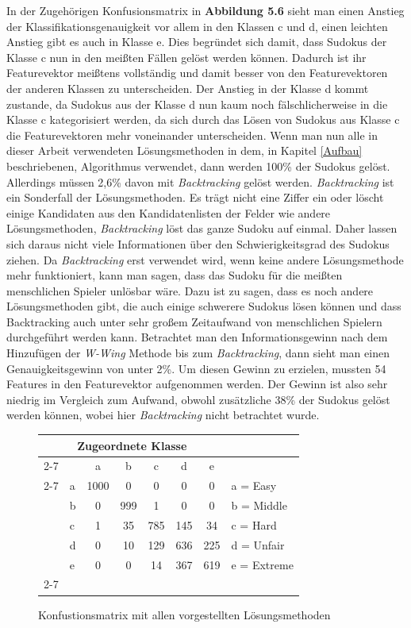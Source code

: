 \noindent In der Zugehörigen Konfusionsmatrix in \textbf{Abbildung 5.6} sieht man einen Anstieg der Klassifikationsgenauigkeit vor allem in den Klassen c und d, einen leichten Anstieg gibt es auch in Klasse e. Dies begründet sich damit, dass Sudokus der Klasse c nun in den meißten Fällen gelöst werden können. Dadurch ist ihr Featurevektor meißtens vollständig und damit besser von den Featurevektoren der anderen Klassen zu unterscheiden. Der Anstieg in der Klasse d kommt zustande, da Sudokus aus der Klasse d nun kaum noch fälschlicherweise in die Klasse c kategorisiert werden, da sich durch das Lösen von Sudokus aus Klasse c die Featurevektoren mehr voneinander unterscheiden.
Wenn man nun alle in dieser Arbeit verwendeten Lösungsmethoden in dem, in Kapitel \ref{Aufbau} beschriebenen, Algorithmus verwendet, dann werden 100\% der Sudokus gelöst. Allerdings müssen 2,6\% davon mit \textit{Backtracking} gelöst werden. \textit{Backtracking} ist ein Sonderfall der Lösungsmethoden. Es trägt nicht eine Ziffer ein oder löscht einige Kandidaten aus den Kandidatenlisten der Felder wie andere Lösungsmethoden, \textit{Backtracking} löst das ganze Sudoku auf einmal. Daher lassen sich daraus nicht viele Informationen über den Schwierigkeitsgrad des Sudokus ziehen. Da \textit{Backtracking} erst verwendet wird, wenn keine andere Lösungsmethode mehr funktioniert, kann man sagen, dass das Sudoku für die meißten menschlichen Spieler unlösbar wäre. Dazu ist zu sagen, dass es noch andere Lösungsmethoden gibt, die auch einige schwerere Sudokus lösen können und dass Backtracking auch unter sehr großem Zeitaufwand von menschlichen Spielern durchgeführt werden kann. Betrachtet man den Informationsgewinn nach dem Hinzufügen der \textit{W-Wing} Methode bis zum \textit{Backtracking}, dann sieht man einen Genauigkeitsgewinn von unter 2\%. Um diesen Gewinn zu erzielen, mussten 54 Features in den Featurevektor aufgenommen werden. Der Gewinn ist also sehr niedrig im Vergleich zum Aufwand, obwohl zusätzliche 38\% der Sudokus gelöst werden können, wobei hier \textit{Backtracking} nicht betrachtet wurde.\\

\begin{figure}[H]
\centering
\begin{tabular}{ l | l |  c  c  c  c  c | l}
\multicolumn{7}{c}{\textbf{Zugeordnete Klasse}}\\
\cline{2-7}
\multirow{6}{*}{\begin{turn}{90}\textbf{Ursprüngliche Klasse}\end{turn}}
 &  & a & b & c & d & e\\
\cline{2-7}
& a & 1000 & 0 & 0 & 0 & 0 & a = Easy \\
& b & 0 & 999 & 1 & 0 & 0 & b = Middle \\
& c & 1 & 35 & 785 & 145 & 34 & c = Hard \\
& d & 0 & 10 & 129 & 636 & 225 & d = Unfair \\
& e & 0 & 0 & 14 & 367 & 619 & e = Extreme \\
\cline{2-7}
\end{tabular}
\caption{Konfustionsmatrix mit allen vorgestellten Lösungsmethoden}
\end{figure}

